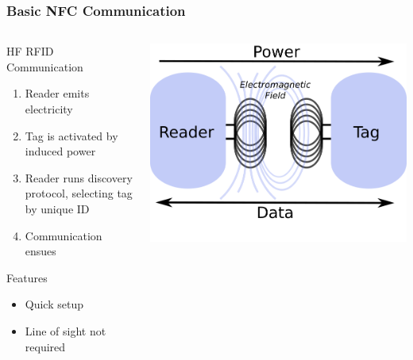 \documentclass[unknownkeysallowed]{beamer}
\begin{document}
\begin{frame}
\frametitle{Basic NFC Communication}
  \begin{center}\begin{minipage}{.9\textwidth}
  \begin{columns}[T]
    \begin{column}{.5\textwidth}
     \begin{block}{HF RFID Communication}
		\begin{enumerate}
		    \item{Reader emits electricity}
		    \item{Tag is activated by induced power}
        	\item{Reader runs discovery protocol, selecting tag by unique ID}
        	\item{Communication ensues}
   		\end{enumerate}
    \end{block}
         \begin{block}{Features}
		\begin{itemize}
        	\item{Quick setup}
        	\item{Line of sight not required}
   		\end{itemize}
    \end{block}
    \end{column}
    \begin{column}{.5\textwidth}
    \begin{block}{}
     \begin{center}
     \includegraphics[width=0.4\paperwidth]{figures/emitterAndTag.png}
     \end{center}
    \end{block}
    \end{column}
  \end{columns}
  \end{minipage}\end{center}
\end{frame}
\end{document}
